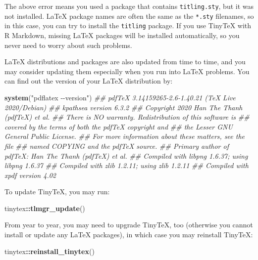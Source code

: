 \documentclass[
  12pt,
]{book}
\newenvironment{Shaded}{\begin{snugshade}}{\end{snugshade}}
\newcommand{\CommentTok}[1]{\textcolor[rgb]{0.56,0.35,0.01}{\textit{#1}}}
\newcommand{\KeywordTok}[1]{\textcolor[rgb]{0.13,0.29,0.53}{\textbf{#1}}}
\newcommand{\NormalTok}[1]{#1}
\newcommand{\OperatorTok}[1]{\textcolor[rgb]{0.81,0.36,0.00}{\textbf{#1}}}
\newcommand{\StringTok}[1]{\textcolor[rgb]{0.31,0.60,0.02}{#1}}
\begin{document}
The above error means you used a package that contains \texttt{titling.sty}, but it was not installed. LaTeX package names are often the same as the \texttt{*.sty} filenames, so in this case, you can try to install the \texttt{titling} package. If you use TinyTeX with R Markdown, missing LaTeX packages will be installed automatically, so you never need to worry about such problems.

LaTeX distributions and packages are also updated from time to time, and you may consider updating them especially when you run into LaTeX problems. You can find out the version of your LaTeX distribution by:

\begin{Shaded}
\begin{Highlighting}[]
\KeywordTok{system}\NormalTok{(}\StringTok{"pdflatex {-}{-}version"}\NormalTok{)}
\CommentTok{\#\# pdfTeX 3.14159265{-}2.6{-}1.40.21 (TeX Live 2020/Debian)}
\CommentTok{\#\# kpathsea version 6.3.2}
\CommentTok{\#\# Copyright 2020 Han The Thanh (pdfTeX) et al.}
\CommentTok{\#\# There is NO warranty.  Redistribution of this software is}
\CommentTok{\#\# covered by the terms of both the pdfTeX copyright and}
\CommentTok{\#\# the Lesser GNU General Public License.}
\CommentTok{\#\# For more information about these matters, see the file}
\CommentTok{\#\# named COPYING and the pdfTeX source.}
\CommentTok{\#\# Primary author of pdfTeX: Han The Thanh (pdfTeX) et al.}
\CommentTok{\#\# Compiled with libpng 1.6.37; using libpng 1.6.37}
\CommentTok{\#\# Compiled with zlib 1.2.11; using zlib 1.2.11}
\CommentTok{\#\# Compiled with xpdf version 4.02}
\end{Highlighting}
\end{Shaded}

To update TinyTeX, you may run:

\begin{Shaded}
\begin{Highlighting}[]
\NormalTok{tinytex}\OperatorTok{::}\KeywordTok{tlmgr\_update}\NormalTok{()}
\end{Highlighting}
\end{Shaded}

From year to year, you may need to upgrade TinyTeX, too (otherwise you cannot install or update any LaTeX packages), in which case you may reinstall TinyTeX:

\begin{Shaded}
\begin{Highlighting}[]
\NormalTok{tinytex}\OperatorTok{::}\KeywordTok{reinstall\_tinytex}\NormalTok{()}
\end{Highlighting}
\end{Shaded}


\printindex
\end{document}

